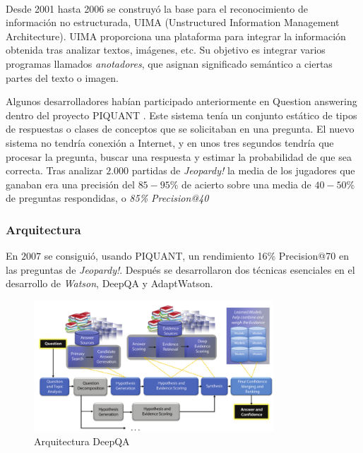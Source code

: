 \documentclass[paper=a4, fontsize=10pt]{scrartcl} %
\numberwithin{equation}{section} %
\numberwithin{figure}{section} %
\numberwithin{table}{section} %
\begin{document}
\

Desde 2001 hasta 2006 se construyó la base para el reconocimiento de información no estructurada, UIMA (Unstructured
Information Management Architecture). %
UIMA proporciona una plataforma para integrar la información obtenida tras analizar textos, imágenes, etc.
Su objetivo es integrar varios programas llamados \textit{anotadores}, que asignan significado semántico a ciertas partes del texto o imagen.


Algunos desarrolladores habían participado anteriormente en Question answering dentro del proyecto PIQUANT \cite{piquant}. %
Este sistema tenía un conjunto estático de tipos de respuestas o clases de conceptos que se solicitaban en una pregunta.
El nuevo sistema no tendría conexión a Internet, y en unos tres segundos tendría que procesar la pregunta, buscar una respuesta y estimar la probabilidad de que sea correcta.
Tras analizar $2.000$ partidas de \textit{Jeopardy!} la media de los jugadores que ganaban era una precisión del $85-95\%$ de acierto sobre una media de $40-50\%$ de preguntas respondidas, o 
\textit{85\% Precision@40}


\subsubsection{Arquitectura}
En $2007$ se consiguió, usando PIQUANT, un rendimiento 16\% Precision@70 en las preguntas de \textit{Jeopardy!}.
Después se desarrollaron dos técnicas esenciales en el desarrollo de \textit{Watson}, DeepQA %
y AdaptWatson. %

\begin{figure}[H]
	\centering
	\label{tiw-deepqa}
	\includegraphics[width=0.8\textwidth]{./Imagenes/deepQA.png}
	\caption{Arquitectura DeepQA}
\end{figure}
\end{document}
